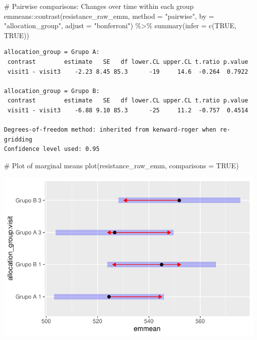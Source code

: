 \documentclass[
  letterpaper,
  DIV=11,
  numbers=noendperiod]{scrartcl}
\newenvironment{Shaded}{\begin{snugshade}}{\end{snugshade}}
\newcommand{\AttributeTok}[1]{\textcolor[rgb]{0.40,0.45,0.13}{#1}}
\newcommand{\CommentTok}[1]{\textcolor[rgb]{0.37,0.37,0.37}{#1}}
\newcommand{\ConstantTok}[1]{\textcolor[rgb]{0.56,0.35,0.01}{#1}}
\newcommand{\FunctionTok}[1]{\textcolor[rgb]{0.28,0.35,0.67}{#1}}
\newcommand{\NormalTok}[1]{\textcolor[rgb]{0.00,0.23,0.31}{#1}}
\newcommand{\SpecialCharTok}[1]{\textcolor[rgb]{0.37,0.37,0.37}{#1}}
\newcommand{\StringTok}[1]{\textcolor[rgb]{0.13,0.47,0.30}{#1}}
\begin{document}
\begin{Shaded}
\begin{Highlighting}[]
\CommentTok{\# Pairwise comparisons: Changes over time within each group}
\NormalTok{emmeans}\SpecialCharTok{::}\FunctionTok{contrast}\NormalTok{(resistance\_raw\_emm, }\AttributeTok{method =} \StringTok{"pairwise"}\NormalTok{, }\AttributeTok{by =} \StringTok{"allocation\_group"}\NormalTok{, }\AttributeTok{adjust =} \StringTok{"bonferroni"}\NormalTok{) }\SpecialCharTok{\%\textgreater{}\%} \FunctionTok{summary}\NormalTok{(}\AttributeTok{infer =} \FunctionTok{c}\NormalTok{(}\ConstantTok{TRUE}\NormalTok{, }\ConstantTok{TRUE}\NormalTok{))}
\end{Highlighting}
\end{Shaded}

\begin{verbatim}
allocation_group = Grupo A:
 contrast        estimate   SE   df lower.CL upper.CL t.ratio p.value
 visit1 - visit3    -2.23 8.45 85.3      -19     14.6  -0.264  0.7922

allocation_group = Grupo B:
 contrast        estimate   SE   df lower.CL upper.CL t.ratio p.value
 visit1 - visit3    -6.88 9.10 85.3      -25     11.2  -0.757  0.4514

Degrees-of-freedom method: inherited from kenward-roger when re-gridding 
Confidence level used: 0.95 
\end{verbatim}

\begin{Shaded}
\begin{Highlighting}[]
\CommentTok{\# Plot of marginal means}
\FunctionTok{plot}\NormalTok{(resistance\_raw\_emm, }\AttributeTok{comparisons =} \ConstantTok{TRUE}\NormalTok{)}
\end{Highlighting}
\end{Shaded}

\includegraphics{Outcomes_V1V2V3_files/figure-pdf/resistance_raw_emm-1.pdf}
\end{document}

